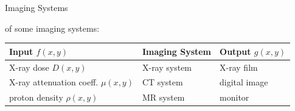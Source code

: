 \begin{frame}[c]{Imaging Systems}

    \myExample{} of some imaging systems:\newline{}

    \begin{table}
        \def\arraystretch{1.7}
        \begin{tabular}{lll}
            \toprule
            Input $f(x,y)$                      & Imaging System & Output $g(x,y)$ \\
            \midrule
            X-ray dose $D(x,y)$                 & X-ray system   & X-ray film      \\
            X-ray attenuation coeff. $\mu(x,y)$ & CT system      & digital image   \\
            proton density $\rho(x,y)$          & MR system      & monitor         \\
            \bottomrule
        \end{tabular}
    \end{table}
\end{frame}














